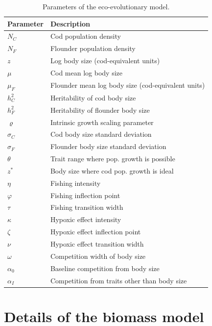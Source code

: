 \documentclass{article}
\begin{document}
\begin{table}[!ht]
    \caption{Parameters of the eco-evolutionary model.}
    \label{tab:si_param}
    \centering
    \begin{tabular}{l|l}
        \textbf{Parameter} & \textbf{Description} \\
        \hline
        $N_C$ & Cod population density \\
        $N_F$ & Flounder population density \\
        $z$ & Log body size (cod-equivalent units) \\
        $\mu$ & Cod mean log body size \\
        $\mu_F$ & Flounder mean log body size (cod-equivalent units) \\
        $h_C^2$ & Heritability of cod body size \\
        $h_F^2$ & Heritability of flounder body size \\
        $\varrho$ & Intrinsic growth scaling parameter \\
        $\sigma_C$ & Cod body size standard deviation \\
        $\sigma_F$ & Flounder body size standard deviation \\
        $\theta$ & Trait range where pop. growth is possible \\
        $z^*$ & Body size where cod pop. growth is ideal \\
        $\eta$ & Fishing intensity \\
        $\varphi$ & Fishing inflection point \\
        $\tau$ & Fishing transition width \\
        $\kappa$ & Hypoxic effect intensity \\
        $\zeta$ & Hypoxic effect inflection point \\
        $\nu$ & Hypoxic effect transition width \\
        $\omega$ & Competition width of body size \\
        $\alpha_0$ & Baseline competition from body size \\
        $\alpha_I$ & Competition from traits other than body size \\
    \end{tabular}
\end{table}



\clearpage
\section{Details of the biomass model} \label{sec:si_biomass}
\end{document}
